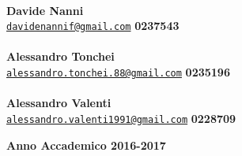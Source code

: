\documentclass[12pt,a4paper]{report}
\begin{document}
\begin{titlepage}
\begin{minipage}[t]{0.78\textwidth}
{ \large{ \\ \bf Davide Nanni} \\ \href{mailto:davidenannif@gmail.com}{\texttt{davidenannif@gmail.com}} \hfill \large{ \bf 0237543 }\\
 \large{ \\ \bf Alessandro Tonchei} \\ \href{mailto:alessandro.tonchei.88@gmail.com}{\texttt{alessandro.tonchei.88@gmail.com}} \hfill \large{ \bf 0235196 }\\
 \large{ \\ \bf Alessandro Valenti} \\ \href{mailto:alessandro.valenti1991@gmail.com}{\texttt{alessandro.valenti1991@gmail.com}} \hfill \large{ \bf 0228709 }\\
}
\end{minipage}
\vspace{25mm}
\par
\begin{center}
{\large{\bf Anno Accademico 2016-2017 }}
\end{center}
\end{titlepage}
\end{document}
